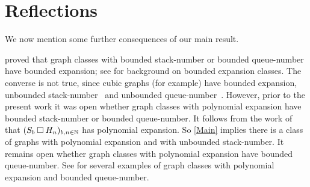 \documentclass[kpfonts]{patmorin}
\newcommand{\CartProd}{\mathbin{\square}}
\begin{document}
\section{Reflections}

We now mention some further consequences of our main result. 

\citet{NOW11} proved that graph classes with bounded stack-number or bounded queue-number have bounded expansion; see \citep{Sparsity} for background on bounded expansion classes. The converse is not true, since cubic graphs (for example) have bounded expansion, unbounded stack-number~\citep{Malitz94a} and unbounded queue-number~\citep{Wood-QueueDegree}. However, prior to the present work it was open whether graph classes with polynomial expansion have bounded stack-number or bounded queue-number. It follows from the work of \citet[Theorem~19]{DHJLW21} that $(S_b \CartProd H_n)_{b,n\in\N}$ has polynomial expansion. So \cref{Main} implies there is a class of graphs with polynomial expansion and with unbounded stack-number. It remains open whether graph classes with polynomial expansion have bounded queue-number. See \citep{DJMMUW20,DMW} for several examples of graph classes with polynomial expansion and bounded queue-number.

\end{document}
